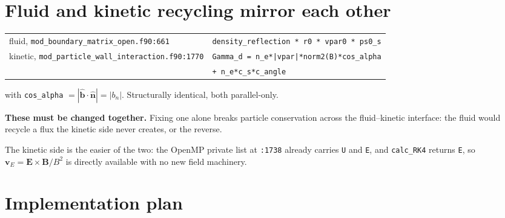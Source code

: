 \documentclass[11pt,a4paper]{article}
\newcommand{\code}[1]{\texttt{\small #1}}
\newcommand{\vE}{\bm v_E}\newcommand{\nhat}{\hat{\bm n}}\newcommand{\that}{\hat{\bm t}}
\begin{document}
\section{Fluid and kinetic recycling mirror each other}

\begin{center}
\begin{tabular}{ll}
\toprule
fluid, \code{mod\_boundary\_matrix\_open.f90:661} & \code{density\_reflection * r0 * vpar0 * ps0\_s} \\
kinetic, \code{mod\_particle\_wall\_interaction.f90:1770} & \code{Gamma\_d = n\_e*|vpar|*norm2(B)*cos\_alpha} \\
 & \code{\qquad\qquad + n\_e*c\_s*c\_angle} \\
\bottomrule
\end{tabular}
\end{center}
with \code{cos\_alpha} $=|\hat{\bm b}\!\cdot\!\nhat| = |b_n|$. Structurally identical, both
parallel-only.

\begin{caution}
\textbf{These must be changed together.} Fixing one alone breaks particle conservation across
the fluid--kinetic interface: the fluid would recycle a flux the kinetic side never creates,
or the reverse.
\end{caution}

\noindent The kinetic side is the easier of the two: the OpenMP private list at \code{:1738}
already carries \code{U} and \code{E}, and \code{calc\_RK4} returns \code{E}, so
$\vE = \bm E\times\bm B/B^2$ is directly available with no new field machinery.

\section{Implementation plan}
\end{document}
